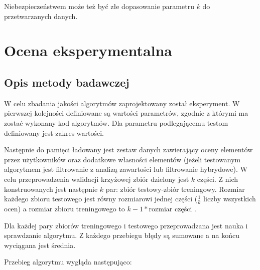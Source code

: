 \documentclass[twoside]{iisthesis}
\begin{document}
		 Niebezpieczeństwem może też być złe dopasowanie parametru $k$ do przetwarzanych danych.
 
\chapter{Ocena eksperymentalna}
	\section{Opis metody badawczej}
	
		W celu zbadania jakości algorytmów zaprojektowany został eksperyment. W pierwszej kolejności definiowane są wartości parametrów, zgodnie z którymi ma zostać wykonany kod algorytmów. 
		Dla parametru podlegającemu testom definiowany jest zakres wartości. 
		
		Następnie do pamięci ładowany jest zestaw danych zawierający oceny elementów przez użytkowników oraz dodatkowe własności elementów (jeżeli testowanym algorytmem jest filtrowanie z analizą zawartości lub filtrowanie hybrydowe). W celu przeprowadzenia walidacji krzyżowej zbiór dzielony jest $k$ części. Z nich konstruowanych jest następnie $k$ par: zbiór testowy-zbiór treningowy. Rozmiar każdego zbioru testowego jest równy rozmiarowi jednej części ($\frac{1}{k}$ liczby wszystkich ocen) a rozmiar zbioru treningowego to $k-1*$rozmiar części .
		
		Dla każdej pary zbiorów treningowego i testowego przeprowadzana jest nauka i sprawdzanie algorytmu. Z każdego przebiegu błędy są sumowane a na końcu wyciągana jest średnia.
		
		Przebieg algorytmu wygląda następująco:
		
\end{document}
